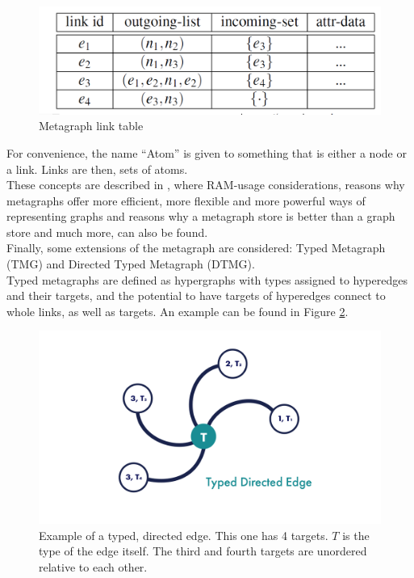 \begin{figure} [h]
\centering
\includegraphics[width=0.8
\textwidth]{figures/Magistrale/metagraph_table}
\caption[Metagraph link table]{Metagraph link table
\label{fig:metagraph_table}}
\end{figure}

For convenience, the name \enquote{Atom} is given to something that is either a node or a link. Links are then, sets of atoms. \\
These concepts are described in \cite{Vep20a, metagraph_app}, where RAM-usage considerations, reasons why metagraphs offer more efficient, more flexible and more powerful ways of representing graphs and reasons why a metagraph store is better than a graph store and much more, can also be found. \\

Finally, some extensions of the metagraph are considered: Typed Metagraph (TMG) and Directed Typed Metagraph (DTMG). \\
Typed metagraphs are defined as hypergraphs with types assigned to hyperedges and their targets, and the potential to have targets of hyperedges connect to whole links, as well as targets. 
An example can be found in Figure \ref{fig:typed_edge}. \\

\begin{figure}[h]
\centering
\includegraphics[width=0.6
\textwidth]{figures/Magistrale/typed_edge}
\caption[Typed Directed Edge]{Example of a typed, directed edge. This one has 4 targets. $T$ is the type of the edge itself. The third and fourth targets are unordered relative to each other.
\label{fig:typed_edge}}
\end{figure}

